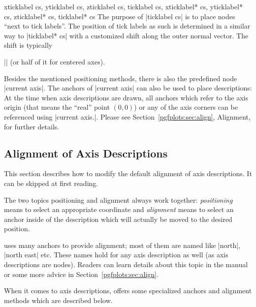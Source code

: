 \begin{coordinatesystemlist}{%
    xticklabel cs,
    yticklabel cs,
    zticklabel cs,
    ticklabel cs,
    xticklabel* cs,
    yticklabel* cs,
    zticklabel* cs,
    ticklabel* cs%
}
    The purpose of |ticklabel cs| is to place nodes ``next to tick labels''.
    The position of tick labels as such is determined in a similar way to
    |ticklabel* cs| with a customized shift along the outer normal vector. The
    shift is typically

    || (or half of it for centered
    axes).
\end{coordinatesystemlist}

Besides the mentioned positioning methods, there is also the predefined node
|current axis|. The anchors of |current axis| can also be used to place
descriptions: At the time when axis descriptions are drawn, all anchors which
refer to the axis origin (that means the ``real'' point $(0,0)$) or any of the
axis corners can be referenced using |current axis.|. Please
see Section~\ref{pgfplots:sec:align}, Alignment, for further details.


\subsection{Alignment of Axis Descriptions}

This section describes how to modify the default alignment of axis
descriptions. It can be skipped at first reading.

The two topics positioning and alignment always work together:
\emph{positioning} means to select an appropriate coordinate and
\emph{alignment} means to select an anchor inside of the description which will
actually be moved to the desired position.

\Tikz{} uses many anchors to provide alignment; most of them are named like
|north|, |north east| etc. These names hold for any axis description as well
(as axis descriptions are \Tikz{} nodes). Readers can learn details about this
topic in the \Tikz{} manual~\cite{tikz} or some more advice in
Section~\ref{pgfplots:sec:align}.

When it comes to axis descriptions, \PGFPlots{} offers some specialized anchors
and alignment methods which are described below.

